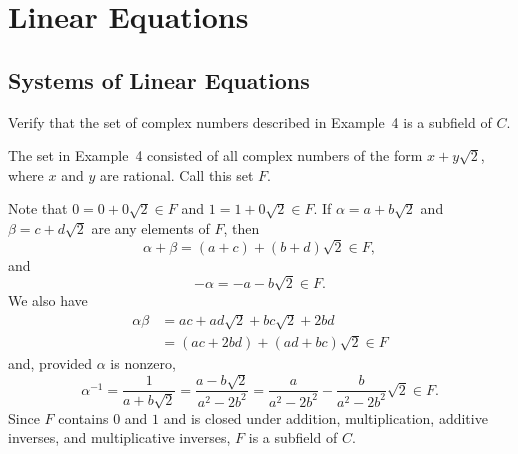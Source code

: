 \chapter{Linear Equations}

\skipsection
\section{Systems of Linear Equations}

 Verify that the set of complex numbers described in
Example~4 is a subfield of $C$.
\begin{solution}
  The set in Example~4 consisted of all complex numbers of the form
  $x + y\sqrt2$, where $x$ and $y$ are rational. Call this set $F$.

  Note that $0 = 0 + 0\sqrt2\in F$ and $1 = 1 + 0\sqrt2\in F$. If
  $\alpha = a + b\sqrt2$ and $\beta = c + d\sqrt2$ are any elements of
  $F$, then
  \begin{equation*}
    \alpha + \beta = (a + c) + (b + d)\sqrt2 \in F,
  \end{equation*}
  and
  \begin{equation*}
    -\alpha = -a - b\sqrt2 \in F.
  \end{equation*}
  We also have
  \begin{align*}
    \alpha\beta
    &= ac + ad\sqrt2 + bc\sqrt2 + 2bd \\
    &= (ac + 2bd) + (ad + bc)\sqrt2 \in F
  \end{align*}
  and, provided $\alpha$ is nonzero,
  \begin{equation*}
    \alpha^{-1}
    = \frac1{a + b\sqrt2}
    = \frac{a - b\sqrt2}{a^2 - 2b^2}
    = \frac{a}{a^2 - 2b^2} - \frac{b}{a^2 - 2b^2}\sqrt2 \in F.
  \end{equation*}
  Since $F$ contains $0$ and $1$ and is closed under addition,
  multiplication, additive inverses, and multiplicative inverses, $F$
  is a subfield of $C$.
\end{solution}

